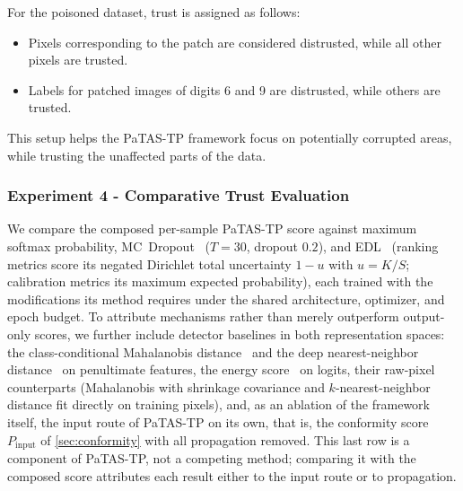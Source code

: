 For the poisoned dataset, trust is assigned as follows:
\begin{itemize}
    \item Pixels corresponding to the patch are considered distrusted, while all other pixels are trusted.
    \item Labels for patched images of digits 6 and 9 are distrusted, while others are trusted.
\end{itemize}

\noindent This setup helps the \ac{PaTAS-TP} framework focus on potentially corrupted areas, while trusting the unaffected parts of the data.

\subsubsection{Experiment 4 - Comparative Trust Evaluation}\label{exp:comparative}
We compare the composed per-sample \ac{PaTAS-TP} score against maximum softmax probability, MC~Dropout~\cite{gal2016dropoutbayesianapproximationrepresenting} ($T{=}30$, dropout $0.2$), and \ac{EDL}~\cite{sensoy2018evidentialdeeplearningquantify} (ranking metrics score its negated Dirichlet total uncertainty $1-u$ with $u = K/S$; calibration metrics its maximum expected probability), each trained with the modifications its method requires under the shared architecture, optimizer, and epoch budget. To attribute mechanisms rather than merely outperform output-only scores, we further include detector baselines in both representation spaces: the class-conditional Mahalanobis distance~\cite{lee2018mahalanobis} and the deep nearest-neighbor distance~\cite{sun2022knnood} on penultimate features, the energy score~\cite{liu2020energy} on logits, their raw-pixel counterparts (Mahalanobis with shrinkage covariance and $k$-nearest-neighbor distance fit directly on training pixels), and, as an ablation of the framework itself, the input route of \ac{PaTAS-TP} on its own, that is, the conformity score $P_{\mathrm{input}}$ of \cref{sec:conformity} with all propagation removed. This last row is a component of \ac{PaTAS-TP}, not a competing method; comparing it with the composed score attributes each result either to the input route or to propagation.

